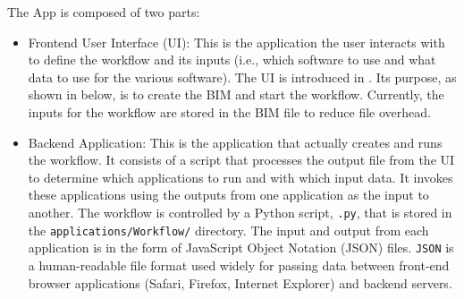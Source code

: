 The \texttt{\getsoftwarename{}} App is composed of two parts:
\begin{itemize}
    \item Frontend User Interface (UI): This is the application the user interacts with to define the workflow and its inputs (i.e., which software to use and what data to use for the various software). The UI is introduced in . Its purpose, as shown in  below, is to create the BIM and start the workflow. Currently, the inputs for the workflow are stored in the BIM file to reduce file overhead.
    \item Backend Application: This is the application that actually creates and runs the workflow. It consists of a script that processes the output file from the UI to determine which applications to run and with which input data. It invokes these applications using the outputs from one application as the input to another. The workflow is controlled by a Python script, \texttt{\getsoftwarename{}.py}, that is stored in the \texttt{applications/Workflow/} directory. The input and output from each application is in the form of JavaScript Object Notation (JSON) files. \texttt{JSON} is a human-readable file format used widely for passing data between front-end browser applications (Safari, Firefox, Internet Explorer) and backend servers.
\end{itemize}

